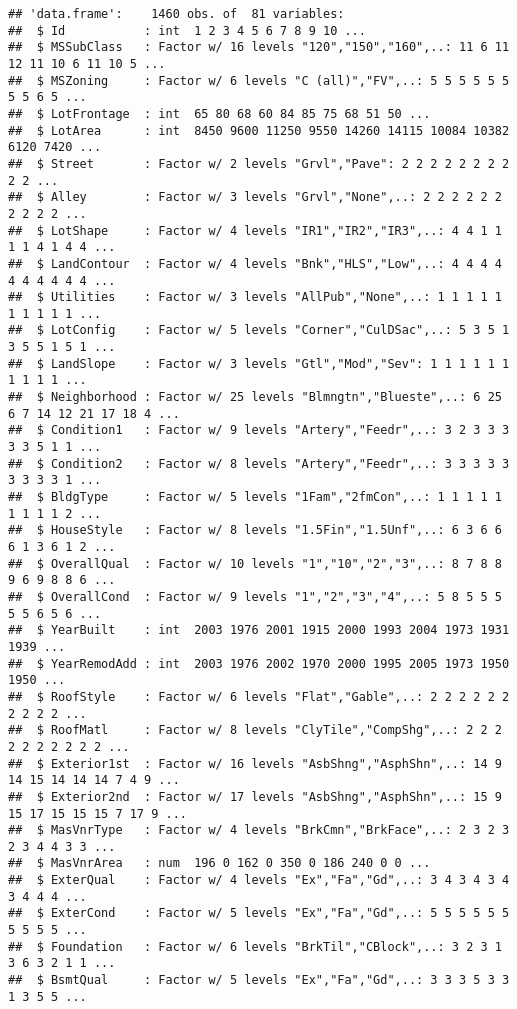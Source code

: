 \documentclass[]{article}
\begin{document}
\begin{verbatim}
## 'data.frame':    1460 obs. of  81 variables:
##  $ Id           : int  1 2 3 4 5 6 7 8 9 10 ...
##  $ MSSubClass   : Factor w/ 16 levels "120","150","160",..: 11 6 11 12 11 10 6 11 10 5 ...
##  $ MSZoning     : Factor w/ 6 levels "C (all)","FV",..: 5 5 5 5 5 5 5 5 6 5 ...
##  $ LotFrontage  : int  65 80 68 60 84 85 75 68 51 50 ...
##  $ LotArea      : int  8450 9600 11250 9550 14260 14115 10084 10382 6120 7420 ...
##  $ Street       : Factor w/ 2 levels "Grvl","Pave": 2 2 2 2 2 2 2 2 2 2 ...
##  $ Alley        : Factor w/ 3 levels "Grvl","None",..: 2 2 2 2 2 2 2 2 2 2 ...
##  $ LotShape     : Factor w/ 4 levels "IR1","IR2","IR3",..: 4 4 1 1 1 1 4 1 4 4 ...
##  $ LandContour  : Factor w/ 4 levels "Bnk","HLS","Low",..: 4 4 4 4 4 4 4 4 4 4 ...
##  $ Utilities    : Factor w/ 3 levels "AllPub","None",..: 1 1 1 1 1 1 1 1 1 1 ...
##  $ LotConfig    : Factor w/ 5 levels "Corner","CulDSac",..: 5 3 5 1 3 5 5 1 5 1 ...
##  $ LandSlope    : Factor w/ 3 levels "Gtl","Mod","Sev": 1 1 1 1 1 1 1 1 1 1 ...
##  $ Neighborhood : Factor w/ 25 levels "Blmngtn","Blueste",..: 6 25 6 7 14 12 21 17 18 4 ...
##  $ Condition1   : Factor w/ 9 levels "Artery","Feedr",..: 3 2 3 3 3 3 3 5 1 1 ...
##  $ Condition2   : Factor w/ 8 levels "Artery","Feedr",..: 3 3 3 3 3 3 3 3 3 1 ...
##  $ BldgType     : Factor w/ 5 levels "1Fam","2fmCon",..: 1 1 1 1 1 1 1 1 1 2 ...
##  $ HouseStyle   : Factor w/ 8 levels "1.5Fin","1.5Unf",..: 6 3 6 6 6 1 3 6 1 2 ...
##  $ OverallQual  : Factor w/ 10 levels "1","10","2","3",..: 8 7 8 8 9 6 9 8 8 6 ...
##  $ OverallCond  : Factor w/ 9 levels "1","2","3","4",..: 5 8 5 5 5 5 5 6 5 6 ...
##  $ YearBuilt    : int  2003 1976 2001 1915 2000 1993 2004 1973 1931 1939 ...
##  $ YearRemodAdd : int  2003 1976 2002 1970 2000 1995 2005 1973 1950 1950 ...
##  $ RoofStyle    : Factor w/ 6 levels "Flat","Gable",..: 2 2 2 2 2 2 2 2 2 2 ...
##  $ RoofMatl     : Factor w/ 8 levels "ClyTile","CompShg",..: 2 2 2 2 2 2 2 2 2 2 ...
##  $ Exterior1st  : Factor w/ 16 levels "AsbShng","AsphShn",..: 14 9 14 15 14 14 14 7 4 9 ...
##  $ Exterior2nd  : Factor w/ 17 levels "AsbShng","AsphShn",..: 15 9 15 17 15 15 15 7 17 9 ...
##  $ MasVnrType   : Factor w/ 4 levels "BrkCmn","BrkFace",..: 2 3 2 3 2 3 4 4 3 3 ...
##  $ MasVnrArea   : num  196 0 162 0 350 0 186 240 0 0 ...
##  $ ExterQual    : Factor w/ 4 levels "Ex","Fa","Gd",..: 3 4 3 4 3 4 3 4 4 4 ...
##  $ ExterCond    : Factor w/ 5 levels "Ex","Fa","Gd",..: 5 5 5 5 5 5 5 5 5 5 ...
##  $ Foundation   : Factor w/ 6 levels "BrkTil","CBlock",..: 3 2 3 1 3 6 3 2 1 1 ...
##  $ BsmtQual     : Factor w/ 5 levels "Ex","Fa","Gd",..: 3 3 3 5 3 3 1 3 5 5 ...

\end{verbatim}
\end{document}
